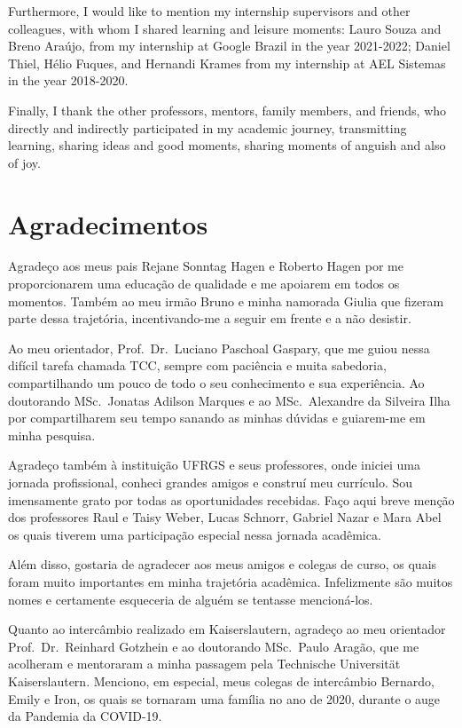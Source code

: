 Furthermore, I would like to mention my internship supervisors and other colleagues, with whom I shared learning and leisure moments: Lauro Souza and Breno Araújo, from my internship at Google Brazil in the year 2021-2022; Daniel Thiel, Hélio Fuques, and Hernandi Krames from my internship at AEL Sistemas in the year 2018-2020.

Finally, I thank the other professors, mentors, family members, and friends, who directly and indirectly participated in my academic journey, transmitting learning, sharing ideas and good moments, sharing moments of anguish and also of joy.

\chapter*{Agradecimentos}

Agradeço aos meus pais Rejane Sonntag Hagen e Roberto Hagen por me proporcionarem uma educação de qualidade e me apoiarem em todos os momentos. Também ao meu irmão Bruno e minha namorada Giulia que fizeram parte dessa trajetória, incentivando-me a seguir em frente e a não desistir.

Ao meu orientador, Prof.~Dr.~Luciano Paschoal Gaspary, que me guiou nessa difícil tarefa chamada TCC, sempre com paciência e muita sabedoria, compartilhando um pouco de todo o seu conhecimento e sua experiência. Ao doutorando MSc.~Jonatas Adilson Marques e ao MSc.~Alexandre da Silveira Ilha por compartilharem seu tempo sanando as minhas dúvidas e guiarem-me em minha pesquisa.

Agradeço também à instituição UFRGS e seus professores, onde iniciei uma jornada profissional, conheci grandes amigos e construí meu currículo. Sou imensamente grato por todas as oportunidades recebidas. Faço aqui breve menção dos professores Raul e Taisy Weber, Lucas Schnorr, Gabriel Nazar e Mara Abel os quais tiverem uma participação especial nessa jornada acadêmica.

Além disso, gostaria de agradecer aos meus amigos e colegas de curso, os quais foram muito importantes em minha trajetória acadêmica. Infelizmente são muitos nomes e certamente esqueceria de alguém se tentasse mencioná-los.

Quanto ao intercâmbio realizado em Kaiserslautern, agradeço ao meu orientador Prof.~Dr.~Reinhard Gotzhein e ao doutorando MSc.~Paulo Aragão, que me acolheram e mentoraram a minha passagem pela Technische Universität Kaiserslautern. Menciono, em especial, meus colegas de intercâmbio Bernardo, Emily e Iron, os quais se tornaram uma família no ano de 2020, durante o auge da Pandemia da COVID-19.

